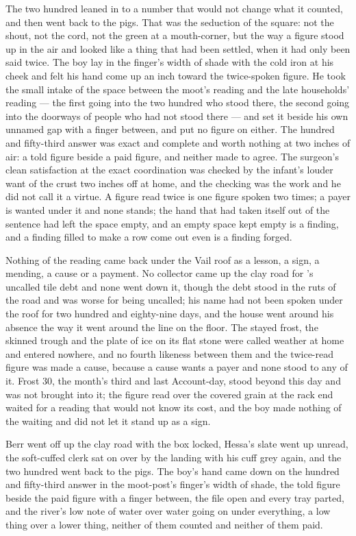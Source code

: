 \scenebreak

The two hundred leaned in to a number that would not change what it counted, and then went back to the pigs. That was the seduction of the square: not the shout, not the cord, not the green at a mouth-corner, but the way a figure stood up in the air and looked like a thing that had been settled, when it had only been said twice. The boy lay in the finger's width of shade with the cold iron at his cheek and felt his hand come up an inch toward the twice-spoken figure. He took the small intake of the space between the moot's reading and the late households' reading --- the first going into the two hundred who stood there, the second going into the doorways of people who had not stood there --- and set it beside his own unnamed gap with a finger between, and put no figure on either. The hundred and fifty-third answer was exact and complete and worth nothing at two inches of air: a told figure beside a paid figure, and neither made to agree. The surgeon's clean satisfaction at the exact coordination was checked by the infant's louder want of the crust two inches off at home, and the checking was the work and he did not call it a virtue. A figure read twice is one figure spoken two times; a payer is wanted under it and none stands; the hand that had taken itself out of the sentence had left the space empty, and an empty space kept empty is a finding, and a finding filled to make a row come out even is a finding forged.

Nothing of the reading came back under the Vail roof as a lesson, a sign, a mending, a cause or a payment. No collector came up the clay road for 's uncalled tile debt and none went down it, though the debt stood in the ruts of the road and was worse for being uncalled; his name had not been spoken under the roof for two hundred and eighty-nine days, and the house went around his absence the way it went around the line on the floor. The stayed frost, the skinned trough and the plate of ice on its flat stone were called weather at home and entered nowhere, and no fourth likeness between them and the twice-read figure was made a cause, because a cause wants a payer and none stood to any of it. Frost 30, the month's third and last Account-day, stood beyond this day and was not brought into it; the figure read over the covered grain at the rack end waited for a reading that would not know its cost, and the boy made nothing of the waiting and did not let it stand up as a sign.

Berr went off up the clay road with the box locked, Hessa's slate went up unread, the soft-cuffed clerk sat on over by the landing with his cuff grey again, and the two hundred went back to the pigs. The boy's hand came down on the hundred and fifty-third answer in the moot-post's finger's width of shade, the told figure beside the paid figure with a finger between, the file open and every tray parted, and the river's low note of water over water going on under everything, a low thing over a lower thing, neither of them counted and neither of them paid.
